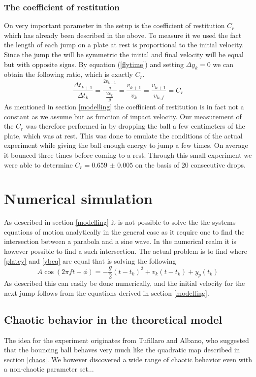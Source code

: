 \documentclass[12pt,oneside,a4paper]{article}
\numberwithin{equation}{section}
\begin{document}
{{{{\subsubsection{The coefficient of restitution}
On very important parameter in the setup is the coefficient of restitution $C_r$ which has already been described in the above. To measure it we used the fact the length of each jump on a plate at rest is proportional to the initial velocity. Since the jump the will be symmetric the initial and final velocity will be equal but with opposite signs. By equation (\ref{flytime}) and setting $\Delta y_k=0$ we can obtain the following ratio, which is exactly $C_r$.
\begin{equation}
	\frac{\Delta t_{k+1}}{\Delta t_{k}}= \frac{\frac{2v_{k+1}}{g}}{\frac{2v_{k}}{g}} = \frac{v_{k+1}}{v_k} = \frac{v_{k+1}}{v_{k,f}} = C_r
\end{equation}
As mentioned in section \ref{modelling} the coefficient of restitution is in fact not a constant as we assume but as function of impact velocity. Our measurement of the $C_r$ was therefore performed in by dropping the ball a few centimeters of the plate, which was at rest. This was done to emulate the conditions of the actual experiment while giving the ball enough energy to jump a few times. On average it bounced three times before coming to a rest. Through this small experiment we were able to determine $C_r= \num{0.659(5)}$ on the basis of 20 consecutive drops. 

\section{Numerical simulation}
As described in section \ref{modelling} it is not possible to solve the the systems equations of motion analytically in the general case as it require one to find the intersection between a parabola and a sine wave. In the numerical realm it is however possible to find a such intersection. The actual problem is to find where \eqref{platey} and \eqref{ybeq} are equal that is solving the following
\begin{equation}
	A \cos(2\pi f t+ \phi) = -\frac{g}{2}(t-t_k)^2+v_k(t-t_k)+y_p(t_k)
\end{equation}
As described this can easily be done numerically, and the initial velocity for the next jump follows from the equations derived in section \ref{modelling}. 

\subsection{Chaotic behavior in the theoretical model}
The idea for the experiment originates from Tufillaro and Albano\cite{tufillaro}, who suggested that the bouncing ball behaves very much like the quadratic map described in section \ref{chaos}. We however discovered a wide range of chaotic behavior even with a non-chaotic parameter set...
}}}}
\end{document}
